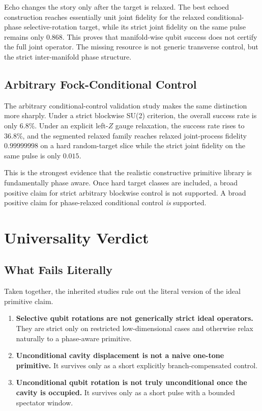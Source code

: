 \documentclass[11pt]{article}
\begin{document}
Echo changes the story only after the target is relaxed. The best echoed construction reaches essentially unit joint fidelity for the relaxed conditional-phase selective-rotation target, while its strict joint fidelity on the same pulse remains only $0.868$. This proves that manifold-wise qubit success does not certify the full joint operator. The missing resource is not generic transverse control, but the strict inter-manifold phase structure.

\subsection{Arbitrary Fock-Conditional Control}

The arbitrary conditional-control validation study makes the same distinction more sharply. Under a strict blockwise SU(2) criterion, the overall success rate is only $6.8\%$. Under an explicit left-$Z$ gauge relaxation, the success rate rises to $36.8\%$, and the segmented relaxed family reaches relaxed joint-process fidelity $0.99999998$ on a hard random-target slice while the strict joint fidelity on the same pulse is only $0.015$.

This is the strongest evidence that the realistic constructive primitive library is fundamentally phase aware. Once hard target classes are included, a broad positive claim for strict arbitrary blockwise control is not supported. A broad positive claim for phase-relaxed conditional control \emph{is} supported.

\section{Universality Verdict}
\label{sec:verdict}

\subsection{What Fails Literally}

Taken together, the inherited studies rule out the literal version of the ideal primitive claim.

\begin{enumerate}
\item \textbf{Selective qubit rotations are not generically strict ideal operators.} They are strict only on restricted low-dimensional cases and otherwise relax naturally to a phase-aware primitive.
\item \textbf{Unconditional cavity displacement is not a naive one-tone primitive.} It survives only as a short explicitly branch-compensated control.
\item \textbf{Unconditional qubit rotation is not truly unconditional once the cavity is occupied.} It survives only as a short pulse with a bounded spectator window.
\end{enumerate}
\end{document}

